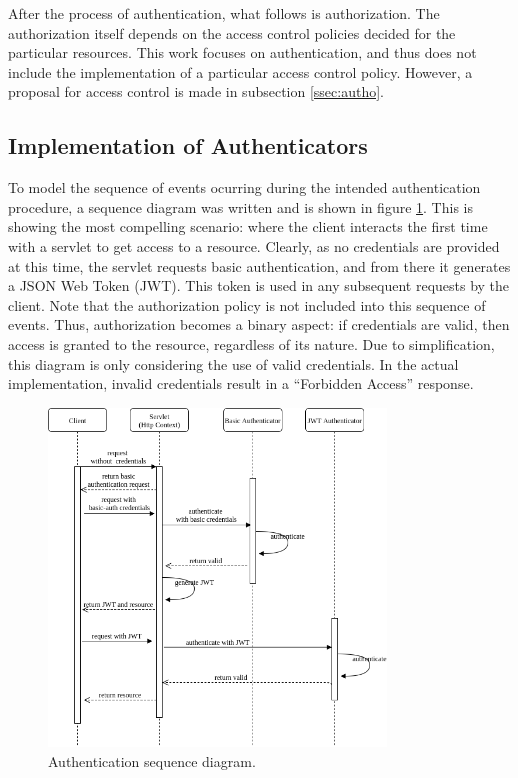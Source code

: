 \documentclass[12pt]{article}
\begin{document}
After the process of authentication, what follows is authorization. The authorization itself depends on the access control policies decided for the particular resources. This work focuses on authentication, and thus does not include the implementation of a particular access control policy. However, a proposal for access control is made in subsection \ref{ssec:autho}.

\subsection{Implementation of Authenticators}
\label{ssec:impl}

To model the sequence of events ocurring during the intended authentication procedure, a sequence diagram was written and is shown in figure \ref{fig:esh_auth_sequence}. This is showing the most compelling scenario: where the client interacts the first time with a servlet to get access to a resource. Clearly, as no credentials are provided at this time, the servlet requests basic authentication, and from there it generates a JSON Web Token (JWT). This token is used in any subsequent requests by the client. Note that the authorization policy is not included into this sequence of events. Thus, authorization becomes a binary aspect: if credentials are valid, then access is granted to the resource, regardless of its nature. Due to simplification, this diagram is only considering the use of valid credentials. In the actual implementation, invalid credentials result in a ``Forbidden Access'' response. 

\begin{figure} [ht] 
\begin{center}
\includegraphics[width=0.8\textwidth]{esh_auth_sequence}
\caption{Authentication sequence diagram.}
\label{fig:esh_auth_sequence}
\end{center}
\end{figure}
\end{document}
